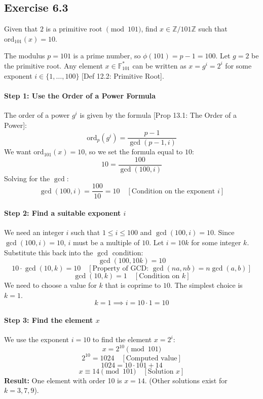 \newpage

\subsection*{Exercise 6.3}
Given that $2$ is a primitive root $\pmod{101}$, find $x \in \mathbb{Z}/101\mathbb{Z}$ such that $\mathrm{ord}_{101}(x)=10$.

\begin{solution}
The modulus $p=101$ is a prime number, so $\phi(101) = p-1 = 100$.
Let $g=2$ be the primitive root. Any element $x \in \mathbb{F}_{101}^*$ can be written as $x = g^i = 2^i$ for some exponent $i \in \{1, \dots, 100\}$ [Def 12.2: Primitive Root].

\paragraph{Step 1: Use the Order of a Power Formula}
The order of a power $g^i$ is given by the formula [Prop 13.1: The Order of a Power]:
$$ \mathrm{ord}_{p}(g^i) = \frac{p-1}{\gcd(p-1, i)} $$
We want $\mathrm{ord}_{101}(x) = 10$, so we set the formula equal to $10$:
$$ 10 = \frac{100}{\gcd(100, i)} $$
Solving for the $\gcd$:
$$ \gcd(100, i) = \frac{100}{10} = 10 \quad [\text{Condition on the exponent } i] \text{}$$

\paragraph{Step 2: Find a suitable exponent $i$}
We need an integer $i$ such that $1 \le i \le 100$ and $\gcd(100, i) = 10$.
Since $\gcd(100, i) = 10$, $i$ must be a multiple of $10$. Let $i = 10k$ for some integer $k$.
Substitute this back into the $\gcd$ condition:
$$ \gcd(100, 10k) = 10 $$
$$ 10 \cdot \gcd(10, k) = 10 \quad [\text{Property of GCD: } \gcd(na, nb)=n\gcd(a, b)] $$
$$ \gcd(10, k) = 1 \quad [\text{Condition on } k] \text{}$$
We need to choose a value for $k$ that is coprime to $10$. The simplest choice is $k=1$.
$$ k=1 \implies i = 10 \cdot 1 = 10 $$

\paragraph{Step 3: Find the element $x$}
We use the exponent $i=10$ to find the element $x=2^i$:
$$ x = 2^{10} \pmod{101} $$
$$ 2^{10} = 1024 \quad [\text{Computed value}] $$
$$ 1024 = 10 \cdot 101 + 14 $$
$$ x \equiv 14 \pmod{101} \quad [\text{Solution } x] \text{} $$
\textbf{Result:} One element with order 10 is $x=14$. (Other solutions exist for $k=3, 7, 9$).
\end{solution}
\newpage
